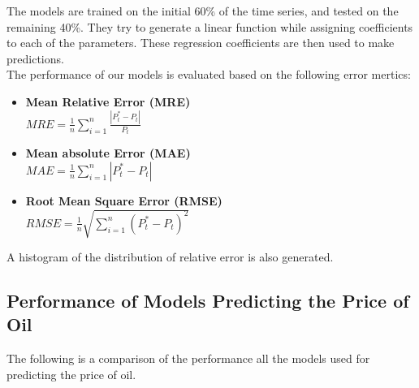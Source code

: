 \documentclass[runningheads]{llncs}
\begin{document}
\noindent The models are trained on the initial 60\% of the time series, and tested on the remaining 40\%. They try to generate a linear function while assigning coefficients to each of the parameters. These regression coefficients are then used to make predictions. \\

The performance of our models is evaluated based on the following error mertics:

\begin {itemize}

\item \textbf{Mean Relative Error (MRE)}\\
$MRE = \frac{1}{n}\sum\limits_{i=1}^n \frac{|P^*_{t} - P_{t}|}{P_t}$\\

\item \textbf{Mean absolute Error (MAE)}\\
$MAE = \frac{1}{n}\sum\limits_{i=1}^n |P^*_{t} - P_{t}|$\\

\item \textbf{Root Mean Square Error (RMSE)}\\
$RMSE = \frac{1}{n}\sqrt{\sum\limits_{i=1}^n (P^*_{t} - P_{t})^2}$\\

\end {itemize}

A histogram of the distribution of relative error is also generated.

\subsection{Performance of Models Predicting the Price of Oil}

\noindent The following is a comparison of the performance all the models used for predicting the price of oil. \\
\end{document}
